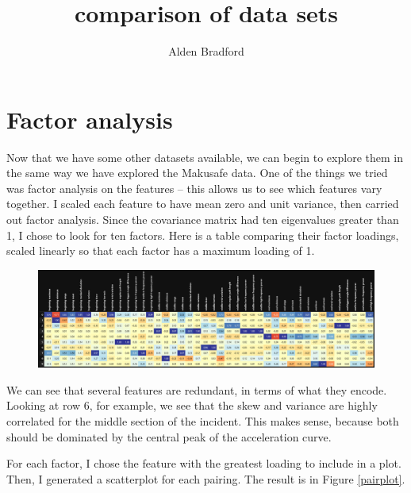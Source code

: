\documentclass{article}
\title{comparison of data sets}
\author{Alden Bradford}
\begin{document}
\maketitle


\section{Factor analysis}
Now that we have some other datasets available, we can begin to explore them in the same way we have explored the Makusafe data. One of the things we tried was factor analysis on the features -- this allows us to see which features vary together. I scaled each feature to have mean zero and unit variance, then carried out factor analysis. Since the covariance matrix had ten eigenvalues greater than 1, I chose to look for ten factors. Here is a table comparing their factor loadings, scaled linearly so that each factor has a maximum loading of 1.

\begin{figure}[h!]
\includegraphics[width=\textwidth]{factors}
\end{figure}

We can see that several features are redundant, in terms of what they encode. Looking at row 6, for example, we see that the skew and variance are highly correlated for the middle section of the incident. This makes sense, because both should be dominated by the central peak of the acceleration curve.

For each factor, I chose the feature with the greatest loading to include in a plot. Then, I generated a scatterplot for each pairing. The result is in Figure \ref{pairplot}.
\end{document}
